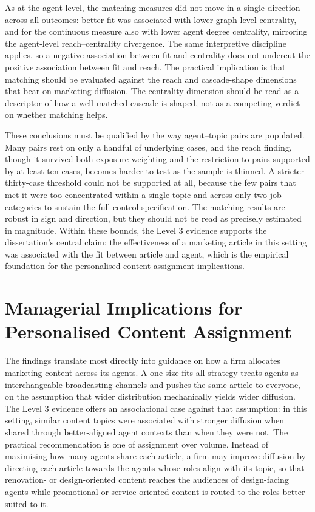 As at the agent level, the matching measures did not move in a single direction across all outcomes: better fit was associated with lower graph-level centrality, and for the continuous  measure also with lower agent degree centrality, mirroring the agent-level reach–centrality divergence. The same interpretive discipline applies, so a negative association between fit and centrality does not undercut the positive association between fit and reach. The practical implication is that matching should be evaluated against the reach and cascade-shape dimensions that bear on marketing diffusion. The centrality dimension should be read as a descriptor of how a well-matched cascade is shaped, not as a competing verdict on whether matching helps.

These conclusions must be qualified by the way agent–topic pairs are populated. Many pairs rest on only a handful of underlying cases, and the reach finding, though it survived both exposure weighting and the restriction to pairs supported by at least ten cases, becomes harder to test as the sample is thinned. A stricter thirty-case threshold could not be supported at all, because the few pairs that met it were too concentrated within a single topic and across only two job categories to sustain the full control specification. The matching results are robust in sign and direction, but they should not be read as precisely estimated in magnitude. Within these bounds, the Level 3 evidence supports the dissertation's central claim: the effectiveness of a marketing article in this setting was associated with the fit between article and agent, which is the empirical foundation for the personalised content-assignment implications.

\section{Managerial Implications for Personalised Content Assignment}
\label{sec:7-4-managerial-implications-for-personalised-content-assignment}

The findings translate most directly into guidance on how a firm allocates marketing content across its agents. A one-size-fits-all strategy treats agents as interchangeable broadcasting channels and pushes the same article to everyone, on the assumption that wider distribution mechanically yields wider diffusion. The Level 3 evidence offers an associational case against that assumption: in this setting, similar content topics were associated with stronger diffusion when shared through better-aligned agent contexts than when they were not. The practical recommendation is one of assignment over volume. Instead of maximising how many agents share each article, a firm may improve diffusion by directing each article towards the agents whose roles align with its topic, so that renovation- or design-oriented content reaches the audiences of design-facing agents while promotional or service-oriented content is routed to the roles better suited to it.

